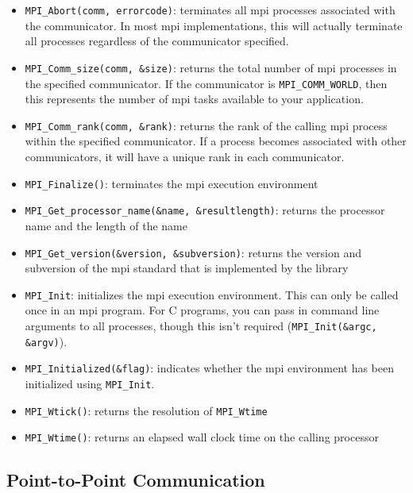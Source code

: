 \documentclass[10pt]{article}
\begin{document}
\begin{flushleft}
\begin{itemize}
\item {\tt MPI\_Abort(comm, errorcode)}: terminates all \gls{mpi} processes associated with the communicator. In most \gls{mpi} implementations, this will actually terminate all processes regardless of the communicator specified.
\item {\tt MPI\_Comm\_size(comm, \&size)}: returns the total number of \gls{mpi} processes in the specified communicator. If the communicator is {\tt MPI\_COMM\_WORLD}, then this represents the number of \gls{mpi} tasks available to your application.
\item {\tt MPI\_Comm\_rank(comm, \&rank)}: returns the rank of the calling \gls{mpi} process within the specified communicator. If a process becomes associated with other communicators, it will have a unique rank in each communicator.
\item {\tt MPI\_Finalize()}: terminates the \gls{mpi} execution environment
\item {\tt MPI\_Get\_processor\_name(\&name, \&resultlength)}: returns the processor name and the length of the name
\item {\tt MPI\_Get\_version(\&version, \&subversion)}: returns the version and subversion of the \gls{mpi} standard that is implemented by the library
\item {\tt MPI\_Init}: initializes the \gls{mpi} execution environment. This can only be called once in an \gls{mpi} program. For C programs, you can pass in command line arguments to all processes, though this isn't required ({\tt MPI\_Init(\&argc, \&argv)}).
\item {\tt MPI\_Initialized(\&flag)}: indicates whether the \gls{mpi} environment has been initialized using {\tt MPI\_Init}. 
\item {\tt MPI\_Wtick()}: returns the resolution of {\tt MPI\_Wtime}
\item {\tt MPI\_Wtime()}: returns an elapsed wall clock time on the calling processor
\end{itemize}

\subsection{Point-to-Point Communication}


\end{flushleft}
\end{document}
